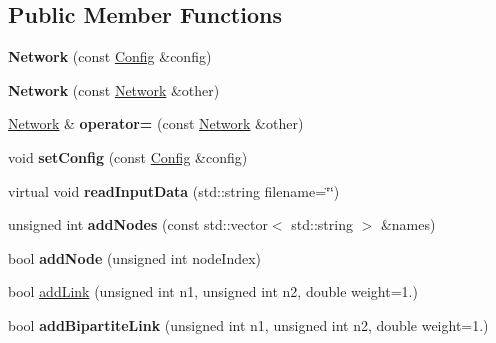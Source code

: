 \subsection*{Public Member Functions}
\begin{DoxyCompactItemize}
\item 
\mbox{\label{classNetwork_a3b0508eeaf582f7dd2f0b1a2a13ce450}} 
{\bfseries Network} (const \mbox{\hyperlink{structConfig}{Config}} \&config)
\item 
\mbox{\label{classNetwork_a9c725e5f622a1720e3b3c66d93b0ad9d}} 
{\bfseries Network} (const \mbox{\hyperlink{classNetwork}{Network}} \&other)
\item 
\mbox{\label{classNetwork_ad2a7d8b707e10e925b56e3e66fda5122}} 
\mbox{\hyperlink{classNetwork}{Network}} \& {\bfseries operator=} (const \mbox{\hyperlink{classNetwork}{Network}} \&other)
\item 
\mbox{\label{classNetwork_a0ca91774ee60af9aa81cb5de33cc948f}} 
void {\bfseries set\+Config} (const \mbox{\hyperlink{structConfig}{Config}} \&config)
\item 
\mbox{\label{classNetwork_aafccd84af6d788277c2f24654d9516c3}} 
virtual void {\bfseries read\+Input\+Data} (std\+::string filename=\char`\"{}\char`\"{})
\item 
\mbox{\label{classNetwork_a260ae396166c4c241494dc30924c3b9d}} 
unsigned int {\bfseries add\+Nodes} (const std\+::vector$<$ std\+::string $>$ \&names)
\item 
\mbox{\label{classNetwork_a3cca2d066f46f2ddf995d813b9239d95}} 
bool {\bfseries add\+Node} (unsigned int node\+Index)
\item 
bool \mbox{\hyperlink{classNetwork_a234269b2addadc7c79f8c0cc43b0b960}{add\+Link}} (unsigned int n1, unsigned int n2, double weight=1.)
\item 
\mbox{\label{classNetwork_a548fca981d51677d90d447cdbf9468d4}} 
bool {\bfseries add\+Bipartite\+Link} (unsigned int n1, unsigned int n2, double weight=1.)
\item 
\mbox{\label{classNetwork_a7e22b758aa97e5031f1af043572bfd00}} 

\end{DoxyCompactItemize}
